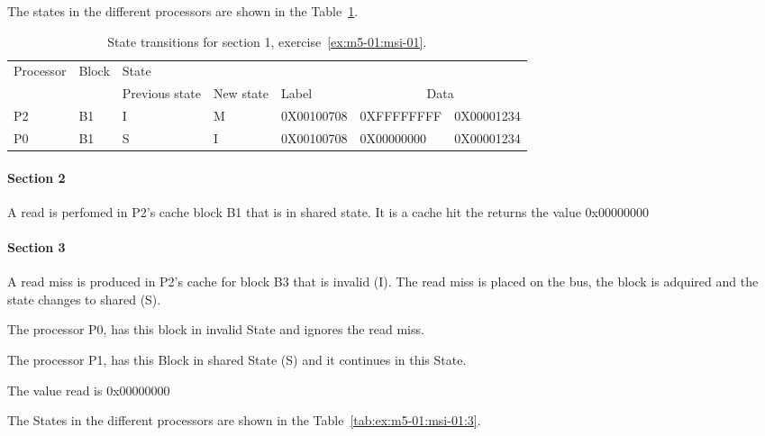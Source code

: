 The states in the different processors are shown in the Table~\ref{tab:ex:m5-01:msi-01:2}.

\begin{table}[htbp]

\begin{tabular}{|l|l|l|l|l|l|l|}

\hline
Processor 	& Block 	& State 	& 		&  		& \multicolumn{2}{c|}{}\\
		&		& Previous state	& New state	& Label	& \multicolumn{2}{c|}{Data}\\
\hline
\hline
P2 & B1 & I & M & 0X00100708 & 0XFFFFFFFF & 0X00001234\\
\hline
P0 & B1 & S & I & 0X00100708 & 0X00000000 & 0X00001234\\
\hline

\end{tabular}

\caption{State transitions for section 1, exercise~\ref{ex:m5-01:msi-01}.}
\label{tab:ex:m5-01:msi-01:2}
\end{table}

\paragraph{Section 2}

A read is perfomed in P2's cache block B1 that is in shared state. It is a cache hit the returns the value 0x00000000

\paragraph{Section 3}

A read miss is produced in P2's cache for block B3 that is invalid (I). The read miss is placed on the bus, the block is adquired and the state changes to shared (S).

The processor P0, has this block in invalid State and ignores the read miss.

The processor P1, has this Block in shared State (S) and it continues in this State.

The value read is 0x00000000

The States in the different processors are shown in the Table~\ref{tab:ex:m5-01:msi-01:3}.

